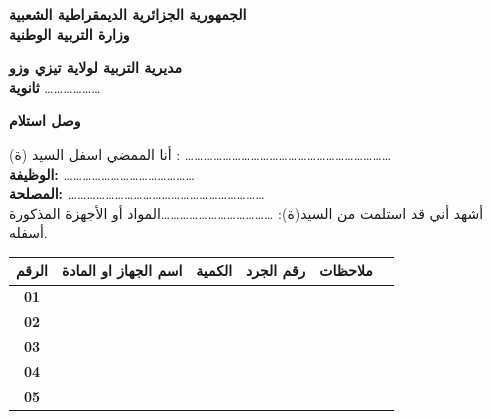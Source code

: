 \documentclass[12pt,a4paper]{article}
\begin{document}
	
	\begin{center}
		{\Large\bfseries الجمهورية الجزائرية الديمقراطية الشعبية} \\[0.3cm]
		{\bfseries وزارة التربية الوطنية} \\[0.4cm]
	\end{center}
	
	\begin{flushright}
		\textbf{مديرية التربية لولاية تيزي وزو} \\
		\textbf{ثانوية}  \dots\dots\dots\dots\dots\dots
	\end{flushright}
	
	\vspace{0.6cm}
	
	\begin{center}
		{\LARGE\bfseries وصل استلام} 
	\end{center}
	
	\vspace{0.8cm}
	
	\noindent
	أنا الممضي اسفل السيد (ة) : \dots\dots\dots\dots\dots\dots\dots\dots\dots\dots\dots\dots\dots\dots\dots\dots\dots\dots\dots\dots\dots\dots \\
	\textbf{الوظيفة:} \dots\dots\dots\dots\dots\dots\dots\dots\dots\dots\dots\dots\dots\dots \\[0.3cm]
	\textbf{المصلحة:} \dots\dots\dots\dots\dots\dots\dots\dots\dots\dots\dots\dots\dots\dots\dots\dots\dots\dots\dots\dots\dots \\
	أشهد أني قد استلمت من السيد(ة): \dots\dots\dots\dots\dots\dots  \dots\dots\dots\dots\dots\dots المواد أو الأجهزة المذكورة أسفله.
	
	\vspace{1cm}
	
	\begin{center}
		\small
		\renewcommand{\arraystretch}{2} 
		\begin{tabularx}{\textwidth}{|c|X|c|c|c|c|}
			\hline
			\textbf{الرقم} & \textbf{اسم الجهاز  او المادة} & \textbf{الكمية} & \textbf{رقم الجرد}  & \textbf{ملاحظات} \\ \hline
			\textbf{01}   &                                     &                         &               &                  \\ \hline
			\textbf{02}   &                                     &                         &               &                  \\ \hline
			\textbf{03}   &                                     &                         &               &                  \\ \hline
			\textbf{04}   &                                     &                         &               &                  \\ \hline
			\textbf{05}   &                                     &                         &               &                  \\ \hline
		\end{tabularx}
	\end{center}
	
\end{document}
